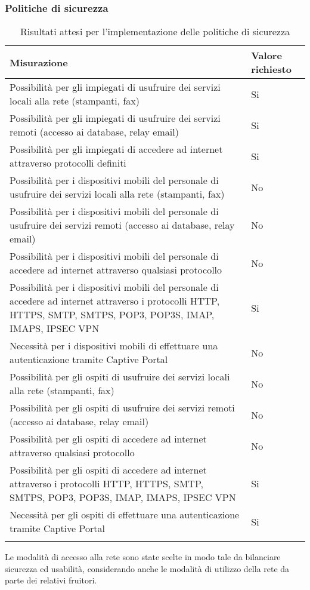 \documentclass[Tesi.tex]{subfiles}
\begin{document}
\subsubsection{Politiche di sicurezza}
\label{table:Risultati attesi per l'implementazione delle politiche di sicurezza}
\renewcommand*{\arraystretch}{1.2}
\begin{longtable}[H]{p{9.5cm}p{3.4cm}}
	\rowcolor{CHeader}
	\color{CHeaderText} \textbf{Misurazione} & \color{CHeaderText} \textbf{Valore richiesto} \\
	\endhead
	Possibilità per gli impiegati di usufruire dei servizi locali alla rete (stampanti, fax) &
	Si \\
	Possibilità per gli impiegati di usufruire dei servizi remoti (accesso ai database, relay email) &
	Si \\
	Possibilità per gli impiegati di accedere ad internet attraverso protocolli definiti &
	Si \\
	Possibilità per i dispositivi mobili del personale di usufruire dei servizi locali alla rete (stampanti, fax) &
	No \\
	Possibilità per i dispositivi mobili del personale di usufruire dei servizi remoti (accesso ai database, relay email) &
	No \\
	Possibilità per i dispositivi mobili del personale di accedere ad internet attraverso qualsiasi protocollo &
	No \\
	Possibilità per i dispositivi mobili del personale di accedere ad internet attraverso i protocolli HTTP, HTTPS, SMTP, SMTPS, POP3, POP3S, IMAP, IMAPS, IPSEC VPN &
	Si \\
	Necessità per i dispositivi mobili di effettuare una autenticazione tramite Captive Portal &
	No \\
	Possibilità per gli ospiti di usufruire dei servizi locali alla rete (stampanti, fax) &
	No \\
	Possibilità per gli ospiti di usufruire dei servizi remoti (accesso ai database, relay email) &
	No \\
	Possibilità per gli ospiti di accedere ad internet attraverso qualsiasi protocollo &
	No \\
	Possibilità per gli ospiti di accedere ad internet attraverso i protocolli HTTP, HTTPS, SMTP, SMTPS, POP3, POP3S, IMAP, IMAPS, IPSEC VPN &
	Si \\
	Necessità per gli ospiti di effettuare una autenticazione tramite Captive Portal &
	Si \\
	\hiderowcolors
	\caption{Risultati attesi per l'implementazione delle politiche di sicurezza}
\end{longtable}
Le modalità di accesso alla rete sono state scelte in modo tale da bilanciare sicurezza ed usabilità, considerando anche le modalità di utilizzo della rete da parte dei relativi fruitori.
\end{document}
